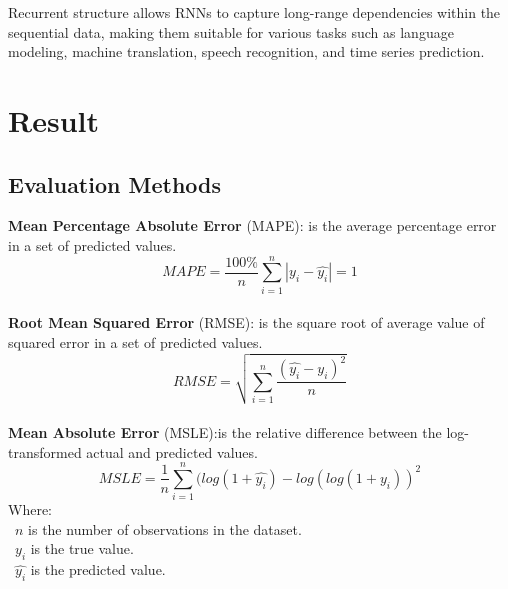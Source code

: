\documentclass{ieeeojies}
\begin{document}
  Recurrent structure allows RNNs to capture long-range dependencies within the sequential data, making them suitable for various tasks such as language modeling, machine translation, speech recognition, and time series prediction.
\section{Result}
\subsection{Evaluation Methods}
\textbf{Mean Percentage Absolute Error} (MAPE): is the average percentage error in a set of predicted values.\\
\[MAPE=\frac{100\%}{n}  \sum_{i=1}^{n} |y_i-\hat{y_i} |  = 1 \]\\
\textbf{Root Mean Squared Error} (RMSE): is the square root of average value of squared error in a set of predicted values.\\
\[RMSE=\sqrt{\sum_{i=1}^{n} \frac{(\hat{y_i}-y_i )^2}{n} }\]\\
\textbf{Mean Absolute Error} (MSLE):is the relative difference between the log-transformed actual and predicted values.\\
\[MSLE=\frac{1}{n}\sum_{i=1}^{n}(log(1+\hat{y_i})-log(log(1+y_i))^2\]
Where: \\
	\indent\textbullet\ \(n\) is the number of observations in the dataset.\\
	\indent\textbullet\ \(y_i\)  is the true value.\\
	\indent\textbullet\ \(\hat{y_i}\) is the predicted value.
\end{document}
